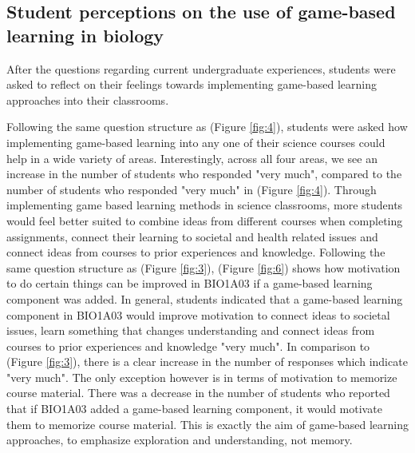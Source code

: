 \documentclass[10pt]{article}
\providecommand{\figref}[1]{(Figure \ref{#1})}  %
\begin{document}
\subsection{Student perceptions on the use of game-based learning in biology}

After the questions regarding current undergraduate experiences, students were asked to reflect on their feelings towards implementing game-based learning approaches into their classrooms. 

Following the same question structure as \figref{fig:4}, students were asked how implementing game-based learning into any one of their science courses could help in a wide variety of areas. Interestingly, across all four areas, we see an increase in the number of students who responded "very much", compared to the number of students who responded "very much" in \figref{fig:4}. Through implementing game based learning methods in science classrooms, more students would feel better suited to combine ideas from different courses when completing assignments, connect their learning to societal and health related issues and connect ideas from courses to prior experiences and knowledge. Following the same question structure as \figref{fig:3}, \figref{fig:6} shows how motivation to do certain things can be improved in BIO1A03 if a game-based learning component was added. In general, students indicated that a game-based learning component in BIO1A03 would improve motivation to connect ideas to societal issues, learn something that changes understanding and connect ideas from courses to prior experiences and knowledge "very much". In comparison to \figref{fig:3}, there is a clear increase in the number of responses which indicate "very much". The only exception however is in terms of motivation to memorize course material. There was a decrease in the number of students who reported that if BIO1A03 added a game-based learning component, it would motivate them to memorize course material. This is exactly the aim of game-based learning approaches, to emphasize exploration and understanding, not memory.
\end{document}
